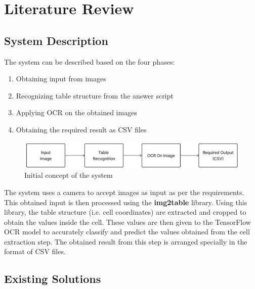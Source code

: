\chapter{Literature Review}
 
\setcounter{equation}{0}

\section{System Description}

The system can be described based on the four phases: 
   \begin{enumerate}
        \item Obtaining input from images 
        \item Recognizing table structure from the answer script 
        \item Applying OCR on the obtained images
	\item Obtaining the required result as CSV files
    \end{enumerate}

\begin{figure}[h!]
    \centering
    \includegraphics[width=1\textwidth]{Images/lit_review/Initial concept of our system.jpg}
    \caption{Initial concept of the system}
\end{figure}

\noindent The system uses a camera to accept images as input as per the requirements. This obtained input is then processed using the \textbf{img2table} library. Using this library, the table structure (i.e. cell coordinates) are extracted and cropped to obtain the values inside the cell. These values are then given to the TensorFlow OCR model to accurately classify and predict the values obtained from the cell extraction step. The obtained result from this step is arranged specially in the format of CSV files. 

\clearpage

\section{Existing Solutions}

